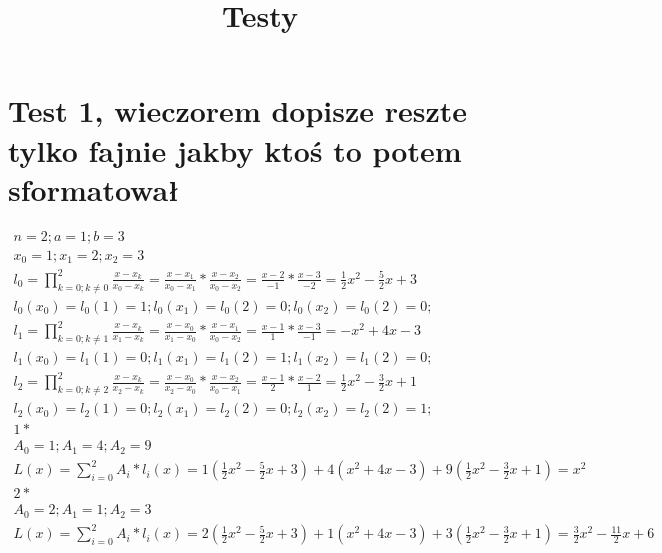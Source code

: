 \documentclass[12pt,a4paper, fleqn]{article}
\title{Testy}
\theoremstyle{definition}
\begin{document}


\section{Test 1, wieczorem dopisze reszte tylko fajnie jakby ktoś to potem sformatował}

	\begin{displaymath} 
\begin{split}
		n=2; a=1; b=3  \\
		x_0=1; x_1=2; x_2=3\\
l_0=\prod\limits_{k=0;k\neq0}^2\frac{x-x_k}{x_0-x_k}=\frac{x-x_1}{x_0-x_1}*\frac{x-x_2}{x_0-x_2}=\frac{x-2}{-1}*\frac{x-3}{-2}=\frac{1}{2}x^2-\frac{5}{2}x+3\\
l_0(x_0)=l_0(1)=1; l_0(x_1)=l_0(2)=0; l_0(x_2)=l_0(2)=0;\\
l_1=\prod\limits_{k=0;k\neq1}^2\frac{x-x_k}{x_1-x_k}=\frac{x-x_0}{x_1-x_0}*\frac{x-x_1}{x_0-x_2}=\frac{x-1}{1}*\frac{x-3}{-1}=-x^2+4x-3\\
l_1(x_0)=l_1(1)=0; l_1(x_1)=l_1(2)=1; l_1(x_2)=l_1(2)=0;\\
l_2=\prod\limits_{k=0;k\neq2}^2\frac{x-x_k}{x_2-x_k}=\frac{x-x_0}{x_2-x_0}*\frac{x-x_2}{x_0-x_1}=\frac{x-1}{2}*\frac{x-2}{1}=\frac{1}{2}x^2-\frac{3}{2}x+1\\
l_2(x_0)=l_2(1)=0; l_2(x_1)=l_2(2)=0; l_2(x_2)=l_2(2)=1;\\
1*\\
A_0=1; A_1=4; A_2=9\\
L(x)=\sum\limits_{i=0}^2A_i*l_i(x)=1(\frac{1}{2}x^2-\frac{5}{2}x+3)+4(x^2+4x-3)+9(\frac{1}{2}x^2-\frac{3}{2}x+1)=x^2\\
2*\\
A_0=2; A_1=1; A_2=3\\
L(x)=\sum\limits_{i=0}^2A_i*l_i(x)=2(\frac{1}{2}x^2-\frac{5}{2}x+3)+1(x^2+4x-3)+3(\frac{1}{2}x^2-\frac{3}{2}x+1)=\frac{3}{2}x^2-\frac{11}{2}x+6\\
\end{split}
\end{displaymath}
\end{document}
